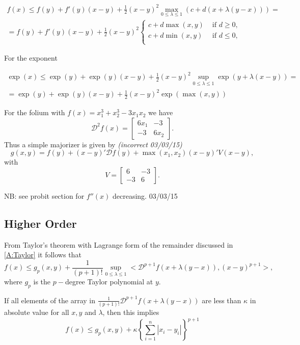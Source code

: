 \documentclass[
  12pt,
]{book}
\begin{document}
\begin{multline*}
f(x)\leq f(y)+f'(y)(x-y)+\frac12(x-y)^2\max_{0\leq\lambda\leq 1}\left(c+
d(x+\lambda(y-x))\right)=\\=f(y)+f'(y)(x-y)+\frac12(x-y)^2
\begin{cases}
c+d\max(x,y)&\text{ if }d\geq 0,\\
c+d\min(x,y)&\text{ if }d\leq 0,\\
\end{cases}
\end{multline*}

For the exponent

\begin{multline*}
\exp(x)\leq \exp(y)+\exp(y)(x-y)+\frac12 (x-y)^2\sup_{0\leq\lambda\leq 1}\exp(y+\lambda(x-y))=\\
=\exp(y)+\exp(y)(x-y)+\frac12 (x-y)^2\exp(\max(x,y))
\end{multline*}

For the folium with \(f(x)=x_1^3+x_2^3-3x_1^{\ }x_2^{\ }\) we have
\[
\mathcal{D}^2f(x)=\begin{bmatrix}6x_1&-3\\-3&6x_2\end{bmatrix}.
\]
Thus a simple majorizer is given by \emph{(incorrect 03/03/15)}
\[
g(x,y)=f(y)+(x-y)'\mathcal{D}f(y)+\max(x_1,x_2)(x-y)'V(x-y),
\]
with
\[
V=\begin{bmatrix}6&-3\\-3&6\end{bmatrix}.
\]

NB: see probit section for \(f''(x)\) decreasing. 03/03/15

\hypertarget{higher-order}{%
\subsection{Higher Order}\label{higher-order}}

From Taylor's theorem with Lagrange form of the remainder discussed in \href{../background/taylor.html}{{[}A:Taylor{]}} it follows that
\[
f(x)\leq g_p(x,y)+\frac{1}{(p+1)!}\sup_{0\leq\lambda\leq 1}<\mathcal{D}^{p+1}f(x+\lambda(y-x)),(x-y)^{p+1}>,
\]
where \(g_p\) is the \(p-\)degree Taylor polynomial at \(y\).

If all elements of the array in \(\frac{1}{(p+1)!}\mathcal{D}^{p+1}f(x+\lambda(y-x))\)
are less than \(\kappa\) in absolute value for all \(x,y\) and \(\lambda\), then this implies
\[
f(x)\leq g_p(x,y)+\kappa\left\{\sum_{i=1}^n|x_i-y_i|\right\}^{p+1}
\]
\end{document}
